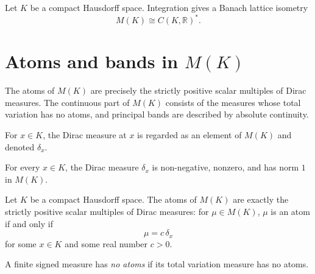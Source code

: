 \begin{theorem}
\label{thm:mofK-dualEquiv}
\leanok
{}
Let $K$ be a compact Hausdorff space. Integration gives a Banach
lattice isometry
\[
  M(K) \cong C(K,\mathbb{R})^{*}.
\]
\end{theorem}

\section{Atoms and bands in \(M(K)\)}

The atoms of $M(K)$ are precisely the strictly positive scalar
multiples of Dirac measures. The continuous part of $M(K)$ consists
of the measures whose total variation has no atoms, and principal
bands are described by absolute continuity.

\begin{definition}
\label{def:mofK-dirac}
\leanok
{}
For $x \in K$, the Dirac measure at $x$ is regarded as an element
of $M(K)$ and denoted $\delta_x$.
\end{definition}

\begin{lemma}
\label{lem:mofK-dirac-basic}
\leanok
{}
For every $x \in K$, the Dirac measure $\delta_x$ is non-negative,
nonzero, and has norm $1$ in $M(K)$.
\end{lemma}

\begin{theorem}
\label{thm:mofK-isVLAtom-dirac}
\leanok
{}
Let $K$ be a compact Hausdorff space. The atoms of $M(K)$ are
exactly the strictly positive scalar multiples of Dirac measures:
for $\mu \in M(K)$, $\mu$ is an atom if and only if
\[
  \mu = c\,\delta_x
\]
for some $x \in K$ and some real number $c>0$.
\end{theorem}

\begin{definition}
\label{def:signedMeasure-noAtoms}
\leanok
{}
A finite signed measure has \emph{no atoms} if its total variation
measure has no atoms.
\end{definition}

